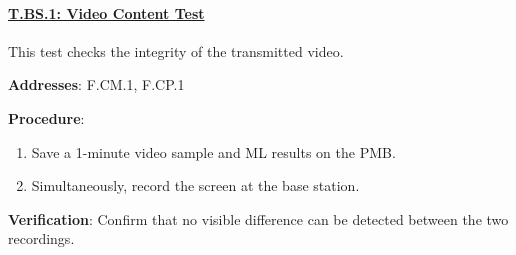 \paragraph{\underline{T.BS.1: Video Content Test}}

This test checks the integrity of the transmitted video.

\textbf{Addresses}: F.CM.1, F.CP.1

\textbf{Procedure}:
\begin{enumerate}[noitemsep]
    \item Save a 1-minute video sample and ML results on the PMB.
    \item Simultaneously, record the screen at the base station.
\end{enumerate}

\textbf{Verification}: 
Confirm that no visible difference can be detected between the two recordings.